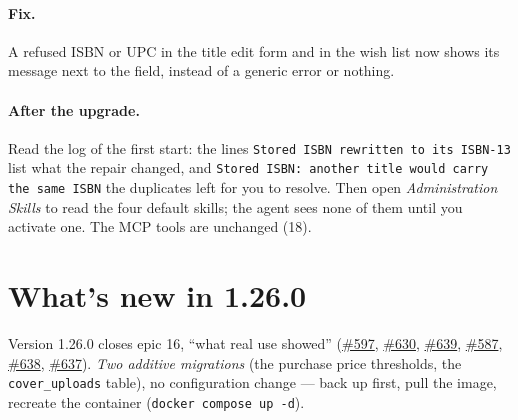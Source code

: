 \paragraph{Fix.} A refused ISBN or UPC in the title edit form and in
the wish list now shows its message next to the field, instead of a
generic error or nothing.

\paragraph{After the upgrade.} Read the log of the first start: the
lines \texttt{Stored ISBN rewritten to its ISBN-13} list what the
repair changed, and \texttt{Stored ISBN: another title would carry the
same ISBN} the duplicates left for you to resolve. Then open
\emph{Administration \textrightarrow{} Skills} to read the four default
skills; the agent sees none of them until you activate one. The MCP
tools are unchanged (18).

\section{What's new in 1.26.0}\label{sec:whats-new-1.26.0}

Version 1.26.0 closes epic 16, ``what real use showed''
(\href{https://github.com/guycorbaz/mybibli/issues/597}{\#597},
\href{https://github.com/guycorbaz/mybibli/issues/630}{\#630},
\href{https://github.com/guycorbaz/mybibli/issues/639}{\#639},
\href{https://github.com/guycorbaz/mybibli/issues/587}{\#587},
\href{https://github.com/guycorbaz/mybibli/issues/638}{\#638},
\href{https://github.com/guycorbaz/mybibli/issues/637}{\#637}). \emph{Two additive migrations} (the
purchase price thresholds, the \texttt{cover\_uploads} table), no
configuration change --- back up first, pull the image, recreate the
container (\texttt{docker compose up -d}).

